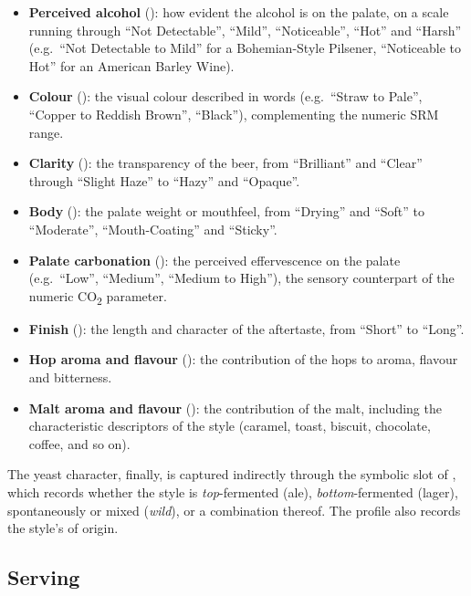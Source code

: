 \begin{itemize}[leftmargin=2em]
  \item \textbf{Perceived alcohol} (): how evident the alcohol is on
        the palate, on a scale running through ``Not Detectable'', ``Mild'',
        ``Noticeable'', ``Hot'' and ``Harsh'' (e.g.\ ``Not Detectable to Mild''
        for a Bohemian-Style Pilsener, ``Noticeable to Hot'' for an American
        Barley Wine).
  \item \textbf{Colour} (): the visual colour described in words
        (e.g.\ ``Straw to Pale'', ``Copper to Reddish Brown'', ``Black''),
        complementing the numeric SRM range.
  \item \textbf{Clarity} (): the transparency of the beer, from
        ``Brilliant'' and ``Clear'' through ``Slight Haze'' to ``Hazy'' and
        ``Opaque''.
  \item \textbf{Body} (): the palate weight or mouthfeel, from
        ``Drying'' and ``Soft'' to ``Moderate'', ``Mouth-Coating'' and
        ``Sticky''.
  \item \textbf{Palate carbonation} (): the perceived
        effervescence on the palate (e.g.\ ``Low'', ``Medium'', ``Medium to
        High''), the sensory counterpart of the numeric CO\textsubscript{2}
        parameter.
  \item \textbf{Finish} (): the length and character of the
        aftertaste, from ``Short'' to ``Long''.
  \item \textbf{Hop aroma and flavour} (): the contribution of the hops
        to aroma, flavour and bitterness.
  \item \textbf{Malt aroma and flavour} (): the contribution of the
        malt, including the characteristic descriptors of the style (caramel,
        toast, biscuit, chocolate, coffee, and so on).
\end{itemize}

The yeast character, finally, is captured indirectly through the symbolic
 slot of , which records whether the
style is \emph{top}-fermented (ale), \emph{bottom}-fermented (lager),
spontaneously or mixed (\emph{wild}), or a combination thereof. The profile also
records the style's  of origin.

\subsection{Serving}

